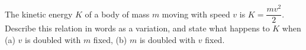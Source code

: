 The kinetic energy $K$ of a body of mass $m$ moving with speed $v$ is $K=\dfrac{mv^2}{2}$. Describe this relation in words as a variation, and state what happens to $K$ when (a) $v$ is doubled with $m$ fixed, (b) $m$ is doubled with $v$ fixed.
